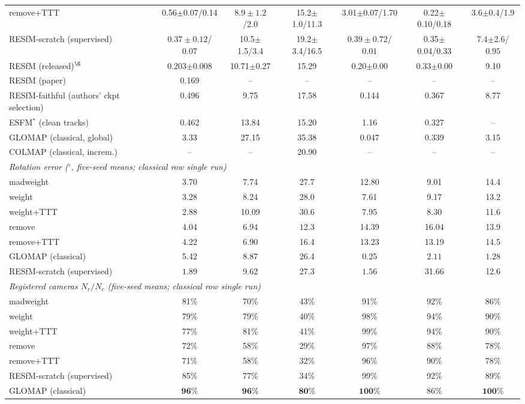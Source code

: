\documentclass{article}
\newcommand{\mad}{madweight}
\renewcommand{\deg}{^{\circ}}
\begin{document}
\begin{table}[t]
{\begin{tabular}{lcccccc}
remove+TTT   & 0.56$\pm$0.07/0.14 & $\mathbf{8.9\pm 1.2}$/2.0 & 15.2$\pm$1.0/11.3 & 3.01$\pm$0.07/1.70 & 0.22$\pm$0.10/0.18 & 3.6$\pm$0.4/1.9\\
RESfM-scratch (supervised)  & $\mathbf{0.37\pm 0.12}$/$\mathbf{0.07}$ & 10.5$\pm$1.5/3.4 & 19.2$\pm$3.4/16.5 & $\mathbf{0.39\pm 0.72}$/$\mathbf{0.01}$ & 0.35$\pm$0.04/0.33 & 7.4$\pm$2.6/$\mathbf{0.95}$\\
\midrule
RESfM (released)$^{\S}$    & 0.203$\pm$0.008 & 10.71$\pm$0.27 & 15.29 & 0.20$\pm$0.00 & 0.33$\pm$0.00 & 9.10\\
RESfM (paper)               & 0.169 & -- & -- & -- & -- & --\\
RESfM-faithful (authors' ckpt selection) & 0.496 & 9.75 & 17.58 & 0.144 & 0.367 & 8.77\\
ESFM$^{\ast}$ (clean tracks) & 0.462 & 13.84 & 15.20 & 1.16 & 0.327 & --\\
GLOMAP (classical, global)  & 3.33 & 27.15 & 35.38 & $\mathbf{0.047}$ & 0.339 & 3.15\\
COLMAP (classical, increm.) & -- & -- & 20.90 & -- & -- & --\\
\midrule
\multicolumn{7}{l}{\emph{Rotation error ($\deg$, five-seed means; classical row single run)}}\\[1pt]
\mad{}       & 3.70 & 7.74 & 27.7 & 12.80 & 9.01 & 14.4\\
weight       & 3.28 & 8.24 & 28.0 & 7.61 & 9.17 & 13.2\\
weight+TTT   & 2.88 & 10.09 & 30.6 & 7.95 & 8.30 & 11.6\\
remove       & 4.04 & $\mathbf{6.94}$ & $\mathbf{12.3}$ & 14.39 & 16.04 & 13.9\\
remove+TTT   & 4.22 & 6.90 & 16.4 & 13.23 & 13.19 & 14.5\\
GLOMAP (classical)          & 5.42 & 8.87 & 26.4 & 0.25 & $\mathbf{2.11}$ & $\mathbf{1.28}$\\
RESfM-scratch (supervised)  & $\mathbf{1.89}$ & 9.62 & 27.3 & $\mathbf{1.56}$ & 31.66 & 12.6\\
\midrule
\multicolumn{7}{l}{\emph{Registered cameras $N_r/N_c$ (five-seed means; classical row single run)}}\\[1pt]
\mad{}       & 81\% & 70\% & 43\% & 91\% & 92\% & 86\%\\
weight       & 79\% & 79\% & 40\% & 98\% & 94\% & 90\%\\
weight+TTT   & 77\% & 81\% & 41\% & 99\% & 94\% & 90\%\\
remove       & 72\% & 58\% & 29\% & 97\% & 88\% & 78\%\\
remove+TTT   & 71\% & 58\% & 32\% & 96\% & 90\% & 78\%\\
RESfM-scratch (supervised)  & 85\% & 77\% & 34\% & 99\% & 92\% & 89\%\\
GLOMAP (classical)          & $\mathbf{96}$\% & $\mathbf{96}$\% & $\mathbf{80}$\% & $\mathbf{100}$\% & 86\% & $\mathbf{100}$\%\\
\bottomrule
\end{tabular}}
\end{table}
\end{document}
